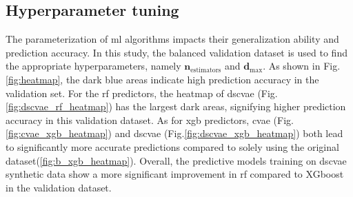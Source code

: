 \documentclass[twoside,twocolumn,9pt]{article}
\begin{document}
\subsection{Hyperparameter tuning}
The parameterization of \acrlong*{ml} algorithms impacts their generalization ability and  prediction accuracy. In this study, the balanced validation dataset is used to find the appropriate hyperparameters, namely $\mathbf{n}_\textrm{estimators}$ and $\mathbf{d}_\textrm{max}$. As shown in Fig.\ref{fig:heatmap}, the dark blue areas indicate high prediction accuracy in the validation set. For the \acrshort*{rf} predictors, the heatmap of \acrshort*{dscvae} (Fig.\ref{fig:dscvae_rf_heatmap}) has the largest dark areas, signifying higher prediction accuracy in this validation dataset. As for \acrlong*{xgb} predictors, \acrshort*{cvae} (Fig.\ref{fig:cvae_xgb_heatmap}) and \acrshort*{dscvae} (Fig.\ref{fig:dscvae_xgb_heatmap}) both lead to significantly more accurate predictions compared to solely using the original dataset(\ref{fig:b_xgb_heatmap}). Overall, the predictive models training on \acrshort*{dscvae} synthetic data show a more significant improvement in \acrshort*{rf} compared to XGboost in the validation dataset.
%
%
\begin{table*}[tb]
\centering
\caption{Validation results for hyperparameter tuning}
\label{tab:valid}
\end{table*}
%
%
\end{document}
